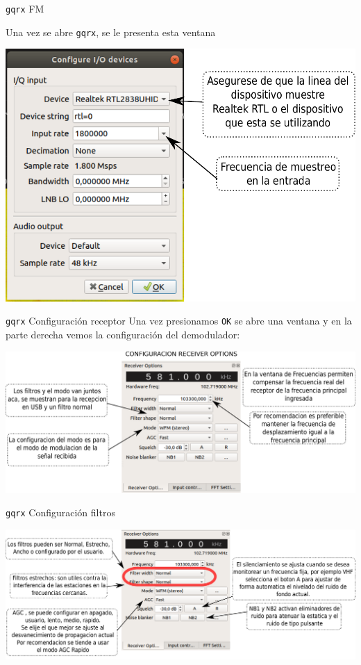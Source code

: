 \begin{frame}{{\tt gqrx} FM}

Una vez se abre {\tt gqrx}, se le presenta esta ventana
\vspace{0.5cm}
\begin{center}
\vspace{-0.3cm}
\includegraphics[width=.7\textwidth]{parte2/lab6/pdf/lab6_p_1.pdf}
\end{center}

\end{frame}

\begin{frame}{{\tt gqrx} Configuración receptor}
Una vez presionamos {\tt OK} se abre una ventana y en la parte derecha vemos la
configuración del demodulador:
\vspace{0.5cm}

\begin{center}
\vspace{-0.3cm}
\includegraphics[width=.7\textwidth]{parte2/lab6/pdf/lab6_p_2.pdf}
\end{center}

\end{frame}

\begin{frame}{{\tt gqrx} Configuración filtros}

\begin{center}
\vspace{-0.3cm}
\includegraphics[width=.7\textwidth]{parte2/lab6/pdf/lab6_p_3.pdf}
\end{center}

\end{frame}

